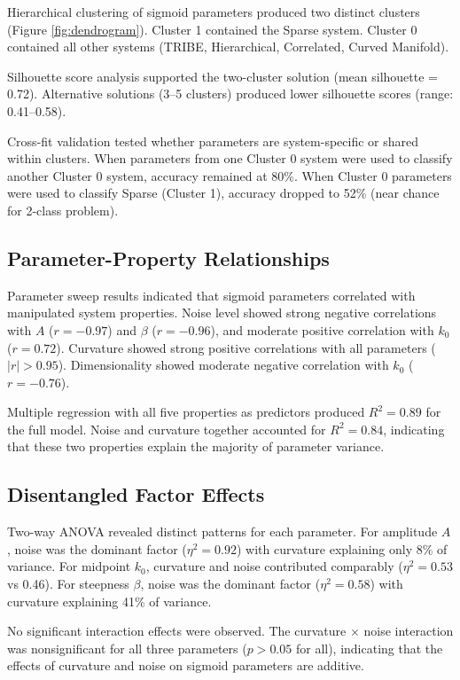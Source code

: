 \documentclass[11pt]{article}
\begin{document}
Hierarchical clustering of sigmoid parameters produced two distinct clusters (Figure \ref{fig:dendrogram}). Cluster 1 contained the Sparse system. Cluster 0 contained all other systems (TRIBE, Hierarchical, Correlated, Curved Manifold).

Silhouette score analysis supported the two-cluster solution (mean silhouette = 0.72). Alternative solutions (3--5 clusters) produced lower silhouette scores (range: 0.41--0.58).

Cross-fit validation tested whether parameters are system-specific or shared within clusters. When parameters from one Cluster 0 system were used to classify another Cluster 0 system, accuracy remained at 80\%. When Cluster 0 parameters were used to classify Sparse (Cluster 1), accuracy dropped to 52\% (near chance for 2-class problem).

\subsection{Parameter-Property Relationships}

Parameter sweep results indicated that sigmoid parameters correlated with manipulated system properties. Noise level showed strong negative correlations with $A$ ($r = -0.97$) and $\beta$ ($r = -0.96$), and moderate positive correlation with $k_0$ ($r = 0.72$). Curvature showed strong positive correlations with all parameters ($|r| > 0.95$). Dimensionality showed moderate negative correlation with $k_0$ ($r = -0.76$).

Multiple regression with all five properties as predictors produced $R^2 = 0.89$ for the full model. Noise and curvature together accounted for $R^2 = 0.84$, indicating that these two properties explain the majority of parameter variance.

\subsection{Disentangled Factor Effects}

Two-way ANOVA revealed distinct patterns for each parameter. For amplitude $A$, noise was the dominant factor ($\eta^2 = 0.92$) with curvature explaining only 8\% of variance. For midpoint $k_0$, curvature and noise contributed comparably ($\eta^2 = 0.53$ vs 0.46). For steepness $\beta$, noise was the dominant factor ($\eta^2 = 0.58$) with curvature explaining 41\% of variance.

No significant interaction effects were observed. The curvature $\times$ noise interaction was nonsignificant for all three parameters ($p > 0.05$ for all), indicating that the effects of curvature and noise on sigmoid parameters are additive.
\end{document}
